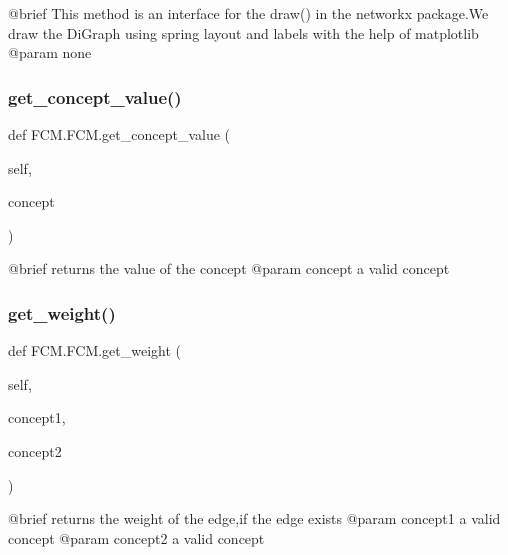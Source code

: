 \begin{DoxyVerb} @brief    This method is an interface for the draw() in the networkx package.We draw the DiGraph using spring layout and labels with the help of matplotlib
 @param none
\end{DoxyVerb}
 \hypertarget{class_f_c_m_1_1_f_c_m_ae764998f2c68740a4e80de8104da992d}{}\label{class_f_c_m_1_1_f_c_m_ae764998f2c68740a4e80de8104da992d} 
\subsubsection{\texorpdfstring{get\+\_\+concept\+\_\+value()}{get\_concept\_value()}}
{\footnotesize\ttfamily def F\+C\+M.\+F\+C\+M.\+get\+\_\+concept\+\_\+value (\begin{DoxyParamCaption}\item[{}]{self,  }\item[{}]{concept }\end{DoxyParamCaption})}

\begin{DoxyVerb}@brief returns the value of the concept
@param concept a valid concept
\end{DoxyVerb}
 \hypertarget{class_f_c_m_1_1_f_c_m_a619a5925ca824a4e633378e2ceeca1fd}{}\label{class_f_c_m_1_1_f_c_m_a619a5925ca824a4e633378e2ceeca1fd} 
\subsubsection{\texorpdfstring{get\+\_\+weight()}{get\_weight()}}
{\footnotesize\ttfamily def F\+C\+M.\+F\+C\+M.\+get\+\_\+weight (\begin{DoxyParamCaption}\item[{}]{self,  }\item[{}]{concept1,  }\item[{}]{concept2 }\end{DoxyParamCaption})}

\begin{DoxyVerb}@brief returns the weight of the edge,if the edge exists
@param concept1 a valid concept
@param concept2 a valid concept
\end{DoxyVerb}
 \hypertarget{class_f_c_m_1_1_f_c_m_afcc0b9388e36ebe07b5b3b6c6d877a05}{}\label{class_f_c_m_1_1_f_c_m_afcc0b9388e36ebe07b5b3b6c6d877a05} 
